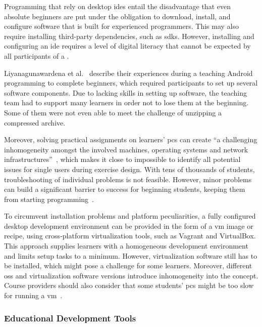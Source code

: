 Programming \moocs that rely on desktop \glspl{ide} entail the disadvantage that even absolute beginners are put under the obligation to download, install, and configure software that is built for experienced programmers. This may also require installing third-party dependencies, such as \glspl{sdk}. However, installing and configuring an \gls{ide} requires a level of digital literacy that cannot be expected by all participants of a \mooc.

Liyanagunawardena et al.~\cite{liyanagunawardena2014teaching} describe their experiences during a \mooc teaching Android programming to complete beginners, which required participants to set up several software components. Due to lacking skills in setting up software, the teaching team had to support many learners in order not to lose them at the beginning. Some of them were not even able to meet the challenge of unzipping a compressed archive.

Moreover, solving practical assignments on learners' \glspl{pc} can create ``a challenging inhomogeneity amongst the involved machines, operating systems and network infrastructures''~\cite{willems2013introducing}, which makes it close to impossible to identify all potential issues for single users during exercise design. With tens of thousands of students, troubleshooting of individual problems is not feasible. However, minor problems can build a significant barrier to success for beginning students, keeping them from starting programming~\cite{lahtinen2005study}.

To circumvent installation problems and platform peculiarities, a fully configured desktop development environment can be provided in the form of a \gls{vm} image or recipe, using cross-platform virtualization tools, such as Vagrant and VirtualBox. This approach supplies learners with a homogeneous development environment and limits setup tasks to a minimum. However, virtualization software still has to be installed, which might pose a challenge for some learners. Moreover, different \glspl{os} and virtualization software versions introduce inhomogeneity into the concept. Course providers should also consider that some students' \glspl{pc} might be too slow for running a \gls{vm}~\cite{fox2014software}.

\subsubsection{Educational Development Tools}

